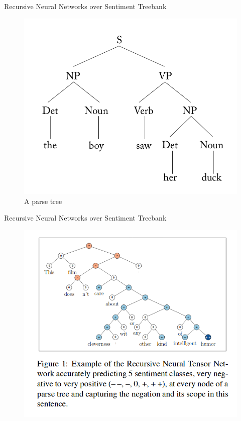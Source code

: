 \documentclass[handout]{beamer}
\begin{document}
\begin{frame}{Recursive Neural Networks over Sentiment Treebank}
   
    \begin{figure}[h]
        	\includegraphics[scale = 0.45]{pics/parseTree.png}
        	\caption{A parse tree}
        \end{figure}       
        
\end{frame}





\begin{frame}{Recursive Neural Networks over Sentiment Treebank}
   
    \begin{figure}[h]
        	\includegraphics[scale = 0.45]{pics/recTensor1.png}
        \end{figure}       
        
\end{frame}
\end{document}
